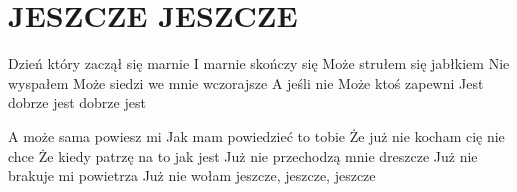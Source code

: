 \documentclass[../../../songbook.tex]{subfiles}
\begin{document}
\TabPositions{8cm} %
\section*{JESZCZE JESZCZE}
{}
\vspace{0.5cm}
Dzień który zaczął się marnie		  \newline	 
I marnie skończy się				 \newline	 
Może strułem się jabłkiem			 \newline	 
Nie wyspałem				    \newline	 
Może siedzi we mnie wczorajsze	  \newline	 
A jeśli nie					   \newline	 
Może ktoś zapewni					 \newline	 
Jest dobrze jest dobrze jest		  \newline

\-\hspace{1cm} A może sama powiesz mi					  \newline
\-\hspace{1cm} Jak mam powiedzieć to tobie				  \newline
\-\hspace{1cm} Że już nie kocham cię nie chce				  \newline
\-\hspace{1cm} Że kiedy patrzę na to jak jest			    \newline
\-\hspace{1cm} Już nie przechodzą mnie dreszcze			  \newline
\-\hspace{1cm} Już nie brakuje mi powietrza			    \newline
\-\hspace{1cm} Już nie wołam jeszcze, jeszcze, jeszcze	  \newline
\end{document}
